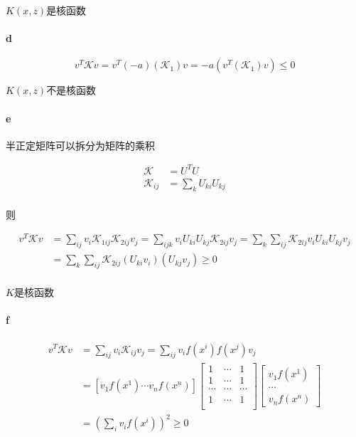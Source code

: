 \documentclass{ctexart}
\begin{document}
	$K(x,z)$是核函数
	
\paragraph{d}

\begin{equation*}
v^T \mathcal{K} v = v^T (-a)(\mathcal{K}_1) v = -a(v^T (\mathcal{K}_1 ) v) \le 0
\end{equation*}		

	$K(x,z)$不是核函数	

\paragraph{e}

半正定矩阵可以拆分为矩阵的乘积

\begin{align*}
	\mathcal{K} &= U^T U  \\
	\mathcal{K}_{ij} &= \sum_{k} U_{ki}U_{kj} \\
\end{align*}

则

\begin{align*}
	v^T \mathcal{K} v &= \sum_{ij} v_i \mathcal{K}_{1ij} \mathcal{K}_{2ij} v_j = \sum_{ijk} v_i U_{ki}U_{kj}\mathcal{K}_{2ij} v_j = \sum_{k} \sum_{ij} \mathcal{K}_{2ij} v_i U_{ki}U_{kj} v_j \\
		&= \sum_{k} \sum_{ij} \mathcal{K}_{2ij} (U_{ki} v_i) (U_{kj} v_j) \ge 0 \\
\end{align*}

$K$是核函数

\paragraph{f}

\begin{align*}
v^T \mathcal{K} v &= \sum_{ij} v_i \mathcal{K}_{ij}  v_j = \sum_{ij} v_i f(x^{i})f(x^{j})  v_j
 \\ &= [v_1 f(x^1) \cdots v_n f(x^n)] \begin{bmatrix}
  1 & \cdots & 1 \\
  1 & \cdots & 1 \\
  \cdots & \cdots & \cdots \\
  1 & \cdots & 1 \\
 \end{bmatrix} \begin{bmatrix}
  v_1 f(x^1) \\ \cdots \\ v_n f(x^n)
 \end{bmatrix} \\ &= (\sum_i v_i f(x^i))^2 \ge 0
\end{align*}
\end{document}
